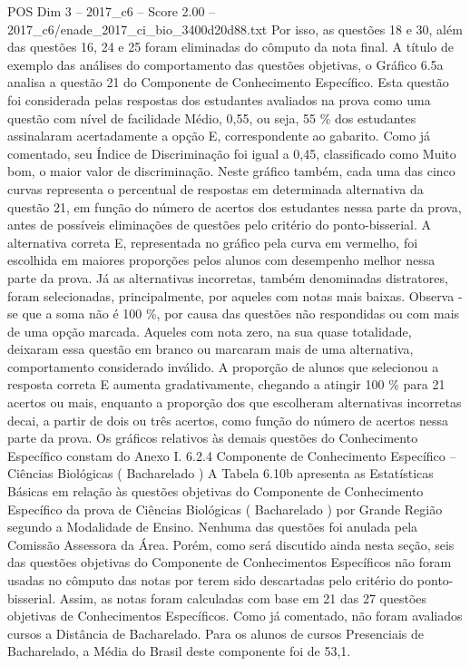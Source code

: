 \begin{textsample}{POS Dim 3 – 2017\_c6 – Score 2.00 – 2017\_c6/enade\_2017\_ci\_bio\_3400d20d88.txt}
Por isso, as questões 18 e 30, além das questões 16, 24 e 25 foram eliminadas do cômputo da nota final.
A título de exemplo das análises do comportamento das questões objetivas, o Gráfico 6.5a analisa a questão 21 do Componente de Conhecimento Específico.
Esta questão foi considerada pelas respostas dos estudantes avaliados na prova como uma questão com nível de facilidade Médio, 0,55, ou seja, 55 \% dos estudantes assinalaram acertadamente a opção E, correspondente ao gabarito.
Como já comentado, seu Índice de Discriminação foi igual a 0,45, classificado como Muito bom, o maior valor de discriminação.
Neste gráfico também, cada uma das cinco curvas representa o percentual de respostas em determinada alternativa da questão 21, em função do número de acertos dos estudantes nessa parte da prova, antes de possíveis eliminações de questões pelo critério do ponto-bisserial.
A alternativa correta E, representada no gráfico pela curva em vermelho, foi escolhida em maiores proporções pelos alunos com desempenho melhor nessa parte da prova.
Já as alternativas incorretas, também denominadas distratores, foram selecionadas, principalmente, por aqueles com notas mais baixas.
Observa -se que a soma não é 100 \%, por causa das questões não respondidas ou com mais de uma opção marcada.
Aqueles com nota zero, na sua quase totalidade, deixaram essa questão em branco ou marcaram mais de uma alternativa, comportamento considerado inválido.
A proporção de alunos que selecionou a resposta correta E aumenta gradativamente, chegando a atingir 100 \% para 21 acertos ou mais, enquanto a proporção dos que escolheram alternativas incorretas decai, a partir de dois ou três acertos, como função do número de acertos nessa parte da prova.
Os gráficos relativos às demais questões do Conhecimento Específico constam do Anexo I. 6.2.4 Componente de Conhecimento Específico – Ciências Biológicas ( Bacharelado ) A Tabela 6.10b apresenta as Estatísticas Básicas em relação às questões objetivas do Componente de Conhecimento Específico da prova de Ciências Biológicas ( Bacharelado ) por Grande Região segundo a Modalidade de Ensino.
Nenhuma das questões foi anulada pela Comissão Assessora da Área.
Porém, como será discutido ainda nesta seção, seis das questões objetivas do Componente de Conhecimentos Específicos não foram usadas no cômputo das notas por terem sido descartadas pelo critério do ponto-bisserial.
Assim, as notas foram calculadas com base em 21 das 27 questões objetivas de Conhecimentos Específicos.
Como já comentado, não foram avaliados cursos a Distância de Bacharelado.
Para os alunos de cursos Presenciais de Bacharelado, a Média do Brasil deste componente foi de 53,1.

\end{textsample}
